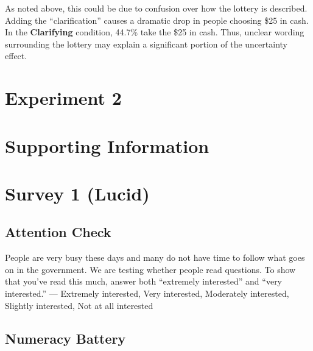 \documentclass[12pt, letterpaper]{article}
\begin{document}
As noted above, this could be due to confusion over how the lottery is described. Adding the ``clarification'' causes a dramatic drop in people choosing \$25 in cash. In the \textbf{Clarifying} condition, 44.7\% take the \$25 in cash. Thus, unclear wording surrounding the lottery may explain a significant portion of the uncertainty effect.

\section*{Experiment 2}



\clearpage


\clearpage

\appendix
\renewcommand{\thesection}{SI \arabic{section}}
\renewcommand\thetable{\thesection.\arabic{table}}  
\renewcommand\thefigure{\thesection.\arabic{figure}}

\section*{Supporting Information}\label{si}

\section{Survey 1 (Lucid)}

\subsection{Attention Check}
People are very busy these days and many do not have time to follow what goes on in the government. We are testing whether people read questions. To show that you've read this much, answer both ``extremely interested'' and ``very interested.'' --- Extremely interested, Very interested, Moderately interested,  Slightly interested, Not at all interested

\subsection{Numeracy Battery}
\end{document}

